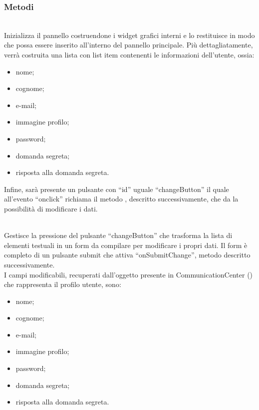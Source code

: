 \subsubsection*{Metodi}
\begin{description}
\item{}\\
Inizializza il pannello costruendone i widget grafici interni e lo restituisce in modo che possa essere inserito all'interno del pannello principale. Più dettagliatamente, verrà costruita una lista con list item contenenti le informazioni dell'utente, ossia:
\begin{itemize}
\item nome;
\item cognome;
\item e-mail;
\item immagine profilo;
\item password;
\item domanda segreta;
\item risposta alla domanda segreta.
\end{itemize}
Infine, sarà presente un pulsante con ``id'' uguale ``changeButton'' il quale all'evento ``onclick'' richiama il metodo , descritto successivamente, che da la possibilità di modificare i dati.


\item{}\\
Gestisce la pressione del pulsante ``changeButton'' che trasforma la lista di elementi testuali in un form da compilare per modificare i propri dati. Il form è completo di un pulsante submit che attiva ``onSubmitChange'', metodo descritto successivamente.\\
I campi modificabili, recuperati dall'oggetto presente in CommunicationCenter () che rappresenta il profilo utente, sono:
\begin{itemize}
\item nome;
\item cognome;
\item e-mail;
\item immagine profilo;
\item password;
\item domanda segreta;
\item risposta alla domanda segreta.
\end{itemize}


\end{description}
